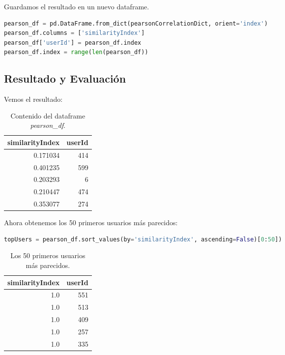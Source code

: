 \documentclass{uimppracticas}
\begin{document}
Guardamos el resultado en un nuevo dataframe.

\begin{lstlisting}[language=python]
pearson_df = pd.DataFrame.from_dict(pearsonCorrelationDict, orient='index')
pearson_df.columns = ['similarityIndex']
pearson_df['userId'] = pearson_df.index
pearson_df.index = range(len(pearson_df))
\end{lstlisting}

\newpage

\subsection{Resultado y Evaluación}



Vemos el resultado:

\begin{table}[h]
	\centering
	\begin{tabular}{rr}
		\toprule
		similarityIndex &  userId \\
		\midrule
		0.171034 &     414 \\
		0.401235 &     599 \\
		0.203293 &       6 \\
		0.210447 &     474 \\
		0.353077 &     274 \\
		\bottomrule
	\end{tabular}
	\caption{Contenido del dataframe \textit{pearson\_df}.}
	\label{pearson}
\end{table}

Ahora obtenemos los 50 primeros usuarios más parecidos:

\begin{lstlisting}[language=python]
topUsers = pearson_df.sort_values(by='similarityIndex', ascending=False)[0:50])
\end{lstlisting}

\begin{table}[h]
	\centering
	\begin{tabular}{rr}
		\toprule
		similarityIndex &  userId \\
		\midrule
		1.0 &     551 \\
		1.0 &     513 \\
		1.0 &     409 \\
		1.0 &     257 \\
		1.0 &     335 \\
		\bottomrule
	\end{tabular}
	\caption{Los 50 primeros usuarios más parecidos.}
	\label{usuarios_parecidos}
\end{table}
\end{document}
